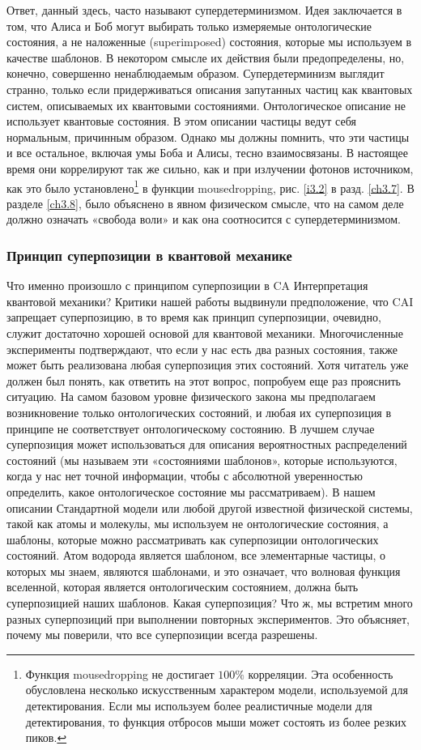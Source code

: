\documentclass[main.tex]{subfiles}
\begin{document}
Ответ, данный здесь, часто называют супердетерминизмом. Идея заключается в том, что Алиса и Боб могут выбирать только измеряемые онтологические состояния, а не наложенные (superimposed) состояния, которые мы используем в качестве шаблонов. В некотором смысле их действия были предопределены, но, конечно, совершенно ненаблюдаемым образом. Супердетерминизм выглядит странно, только если придерживаться описания запутанных частиц как квантовых систем, описываемых их квантовыми состояниями. Онтологическое описание не использует квантовые состояния. В этом описании частицы ведут себя нормальным, причинным образом. Однако мы должны помнить, что эти частицы и все остальное, включая умы Боба и Алисы, тесно взаимосвязаны. В настоящее время они коррелируют так же сильно, как и при излучении фотонов источником, как это было установлено\footnote{Функция mousedropping не достигает $100 \%$ корреляции. Эта особенность обусловлена несколько искусственным характером модели, используемой для детектирования. Если мы используем более реалистичные модели для детектирования, то функция отбросов мыши может состоять из более резких пиков.} в функции mousedropping, рис. \ref{i3.2} в разд. \ref{ch3.7}.
В разделе \ref{ch3.8}, было объяснено в явном физическом смысле, что на самом деле должно означать «свобода воли» и как она соотносится с супердетерминизмом.

\subsubsection{Принцип суперпозиции в квантовой механике}\label{ch5.7.4}

Что именно произошло с принципом суперпозиции в CA Интерпретация квантовой механики? Критики нашей работы выдвинули предположение, что CAI запрещает суперпозицию, в то время как принцип суперпозиции, очевидно, служит достаточно хорошей основой для квантовой механики. Многочисленные эксперименты подтверждают, что если у нас есть два разных состояния, также может быть реализована любая суперпозиция этих состояний. Хотя читатель уже должен был понять, как ответить на этот вопрос, попробуем еще раз прояснить ситуацию.
На самом базовом уровне физического закона мы предполагаем возникновение только онтологических состояний, и любая их суперпозиция в принципе не соответствует онтологическому состоянию. В лучшем случае суперпозиция может использоваться для описания вероятностных распределений состояний (мы называем эти «состояниями шаблонов», которые используются, когда у нас нет точной информации, чтобы с абсолютной уверенностью определить, какое онтологическое состояние мы рассматриваем). В нашем описании Стандартной модели или любой другой известной физической системы, такой как атомы и молекулы, мы используем не онтологические состояния, а шаблоны, которые можно рассматривать как суперпозиции онтологических состояний. Атом водорода является шаблоном, все элементарные частицы, о которых мы знаем, являются шаблонами, и это означает, что волновая функция вселенной, которая является онтологическим состоянием, должна быть суперпозицией наших шаблонов. Какая суперпозиция? Что ж, мы встретим много разных суперпозиций при выполнении повторных экспериментов. Это объясняет, почему мы поверили, что все суперпозиции всегда разрешены.
\end{document}
